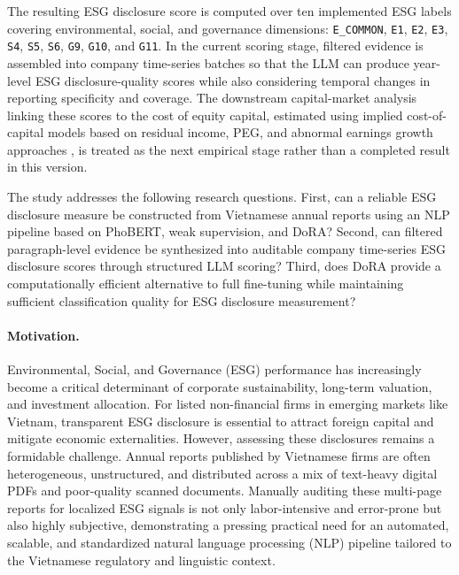 \documentclass{article}
\theoremstyle{plain}
\theoremstyle{definition}
\theoremstyle{remark}
\begin{document}
The resulting ESG disclosure score is computed over ten implemented ESG labels covering environmental, social, and governance dimensions: \texttt{E\_COMMON}, \texttt{E1}, \texttt{E2}, \texttt{E3}, \texttt{S4}, \texttt{S5}, \texttt{S6}, \texttt{G9}, \texttt{G10}, and \texttt{G11}. In the current scoring stage, filtered evidence is assembled into company time-series batches so that the LLM can produce year-level ESG disclosure-quality scores while also considering temporal changes in reporting specificity and coverage. The downstream capital-market analysis linking these scores to the cost of equity capital, estimated using implied cost-of-capital models based on residual income, PEG, and abnormal earnings growth approaches \citep{gebhardt2001toward,easton2004pe,ohlson2005expected}, is treated as the next empirical stage rather than a completed result in this version.


The study addresses the following research questions. First, can a reliable ESG disclosure measure be constructed from Vietnamese annual reports using an NLP pipeline based on PhoBERT, weak supervision, and DoRA? Second, can filtered paragraph-level evidence be synthesized into auditable company time-series ESG disclosure scores through structured LLM scoring? Third, does DoRA provide a computationally efficient alternative to full fine-tuning while maintaining sufficient classification quality for ESG disclosure measurement?

\paragraph{Motivation.}
Environmental, Social, and Governance (ESG) performance has increasingly become a critical determinant of corporate sustainability, long-term valuation, and investment allocation. For listed non-financial firms in emerging markets like Vietnam, transparent ESG disclosure is essential to attract foreign capital and mitigate economic externalities. However, assessing these disclosures remains a formidable challenge. Annual reports published by Vietnamese firms are often heterogeneous, unstructured, and distributed across a mix of text-heavy digital PDFs and poor-quality scanned documents. Manually auditing these multi-page reports for localized ESG signals is not only labor-intensive and error-prone but also highly subjective, demonstrating a pressing practical need for an automated, scalable, and standardized natural language processing (NLP) pipeline tailored to the Vietnamese regulatory and linguistic context.
\end{document}
